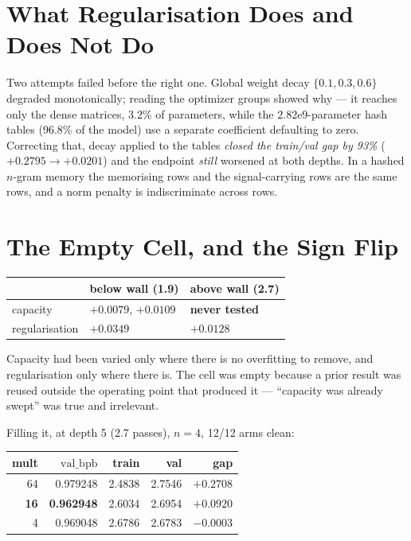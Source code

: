 \documentclass{article}
\newcommand{\vb}{\mathrm{val\_bpb}}
\begin{document}
\section{What Regularisation Does and Does Not Do}
Two attempts failed before the right one. Global weight decay $\{0.1,0.3,0.6\}$ degraded monotonically; reading the optimizer groups showed why --- it reaches only the dense matrices, $3.2$\% of parameters, while the $2.82$e9-parameter hash tables (96.8\% of the model) use a separate coefficient defaulting to zero. Correcting that, decay applied to the tables \emph{closed the train/val gap by 93\%} ($+0.2795 \to +0.0201$) and the endpoint \emph{still} worsened at both depths. In a hashed $n$-gram memory the memorising rows and the signal-carrying rows are the same rows, and a norm penalty is indiscriminate across rows.

\section{The Empty Cell, and the Sign Flip}
\begin{center}\begin{small}
\begin{tabular}{lll}
\toprule
 & below wall (1.9) & above wall (2.7) \\
\midrule
capacity & $+0.0079$, $+0.0109$ & \textbf{never tested} \\
regularisation & $+0.0349$ & $+0.0128$ \\
\bottomrule
\end{tabular}
\end{small}\end{center}

Capacity had been varied only where there is no overfitting to remove, and regularisation only where there is. The cell was empty because a prior result was reused outside the operating point that produced it --- ``capacity was already swept'' was true and irrelevant.

Filling it, at depth 5 (2.7 passes), $n{=}4$, 12/12 arms clean:

\begin{center}\begin{small}
\begin{tabular}{rrrrr}
\toprule
mult & $\vb$ & train & val & gap \\
\midrule
64 & 0.979248 & 2.4838 & 2.7546 & $+0.2708$ \\
\textbf{16} & \textbf{0.962948} & 2.6034 & 2.6954 & $+0.0920$ \\
4 & 0.969048 & 2.6786 & 2.6783 & $-0.0003$ \\
\bottomrule
\end{tabular}
\end{small}\end{center}
\end{document}
